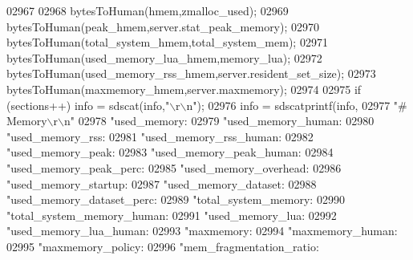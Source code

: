 \begin{DoxyCode}
{{{{{{{{{{{{{{{{{{{{{{{{{{{{{{{{{{{{{{{{{{{{{{{{{{{{{{{{{{{{{{{{02967 
02968         bytesToHuman(hmem,zmalloc\_used);
02969         bytesToHuman(peak\_hmem,server.stat\_peak\_memory);
02970         bytesToHuman(total\_system\_hmem,total\_system\_mem);
02971         bytesToHuman(used\_memory\_lua\_hmem,memory\_lua);
02972         bytesToHuman(used\_memory\_rss\_hmem,server.resident\_set\_size);
02973         bytesToHuman(maxmemory\_hmem,server.maxmemory);
02974 
02975         \textcolor{keywordflow}{if} (sections++) info = sdscat(info,\textcolor{stringliteral}{"\(\backslash\)r\(\backslash\)n"});
02976         info = sdscatprintf(info,
02977             \textcolor{stringliteral}{"# Memory\(\backslash\)r\(\backslash\)n"}
02978             \textcolor{stringliteral}{"used\_memory:%
02979             \textcolor{stringliteral}{"used\_memory\_human:%
02980             \textcolor{stringliteral}{"used\_memory\_rss:%
02981             \textcolor{stringliteral}{"used\_memory\_rss\_human:%
02982             \textcolor{stringliteral}{"used\_memory\_peak:%
02983             \textcolor{stringliteral}{"used\_memory\_peak\_human:%
02984             \textcolor{stringliteral}{"used\_memory\_peak\_perc:%
02985             \textcolor{stringliteral}{"used\_memory\_overhead:%
02986             \textcolor{stringliteral}{"used\_memory\_startup:%
02987             \textcolor{stringliteral}{"used\_memory\_dataset:%
02988             \textcolor{stringliteral}{"used\_memory\_dataset\_perc:%
02989             \textcolor{stringliteral}{"total\_system\_memory:%
02990             \textcolor{stringliteral}{"total\_system\_memory\_human:%
02991             \textcolor{stringliteral}{"used\_memory\_lua:%
02992             \textcolor{stringliteral}{"used\_memory\_lua\_human:%
02993             \textcolor{stringliteral}{"maxmemory:%
02994             \textcolor{stringliteral}{"maxmemory\_human:%
02995             \textcolor{stringliteral}{"maxmemory\_policy:%
02996             \textcolor{stringliteral}{"mem\_fragmentation\_ratio:%
}}}}}}}}}}}}}}}}}}}}}}}}}}}}}}}}}}}}}}}}}}}}}}}}}}}}}}}}}}}}}}}}}}}}}}}}}}}}}}}}}}}
\end{DoxyCode}
